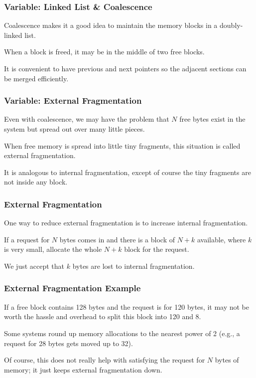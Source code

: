 \begin{frame}
\frametitle{Variable: Linked List \& Coalescence}

Coalescence makes it a good idea to maintain the memory blocks in a doubly-linked list.

When a block is freed, it may be in the middle of two free blocks. 

It is convenient to have previous and next pointers so the adjacent sections can be merged efficiently.


\end{frame}

\begin{frame}
\frametitle{Variable: External Fragmentation}

Even with coalescence, we may have the problem that $N$ free bytes exist in the system but spread out over many little pieces.

When free memory is spread into little tiny fragments, this situation is called \alert{external fragmentation}. 

It is analogous to internal fragmentation, except of course the tiny fragments are not inside any block.


\end{frame}

\begin{frame}
\frametitle{External Fragmentation}

One way to reduce external fragmentation is to increase internal fragmentation. 

If a request for $N$ bytes comes in and there is a block of $N+k$ available, where $k$ is very small, allocate the whole $N+k$ block for the request.

We just accept that $k$ bytes are lost to internal fragmentation.

\end{frame}

\begin{frame}
\frametitle{External Fragmentation Example}

If a free block contains 128 bytes and the request is for 120 bytes, it may not be worth the hassle and overhead to split this block into 120 and 8. 

Some systems round up memory allocations to the nearest power of 2 (e.g., a request for 28 bytes gets moved up to 32). 

Of course, this does not really help with satisfying the request for $N$ bytes of memory; it just keeps external fragmentation down.

\end{frame}

